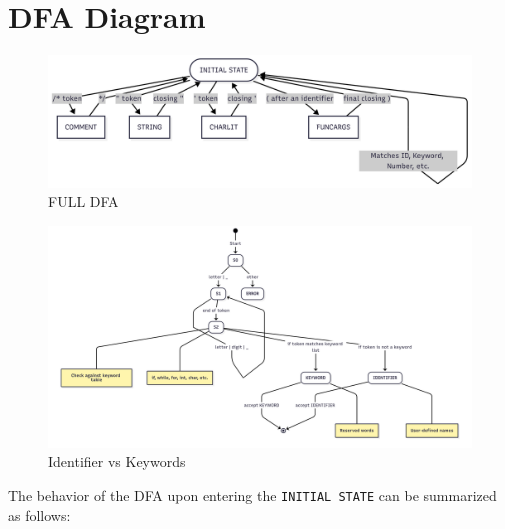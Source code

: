 \documentclass[12pt,a4paper]{article}
\begin{document}
\vspace{2cm}


\section{DFA Diagram}

\begin{figure}[H]
    \centering %
    \includegraphics[width=1\textwidth]{Initial States.png}
    \caption{FULL DFA}
\end{figure}

\begin{figure}[H]
    \centering %
    \includegraphics[width=1\textwidth]{IDKEY.png}
    \caption{Identifier vs Keywords}
\end{figure}




The behavior of the DFA upon entering the \texttt{INITIAL STATE} can be summarized as follows:
\end{document}
